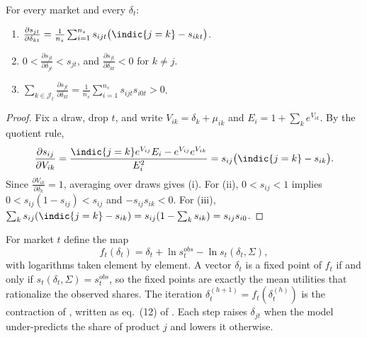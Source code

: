 \begin{lemma}\label{lem:C-sdelta}
For every market and every $\delta_t$:
\begin{enumerate}[label=(\roman*)]
  \item $\frac{\partial s_{jt}}{\partial\delta_{kt}} = \frac{1}{n_s}\sum_{i=1}^{n_s}s_{ijt}\big(\indic\{j = k\} -
  s_{ikt}\big)$.
  \item $0 < \frac{\partial s_{jt}}{\partial\delta_{jt}} < s_{jt}$, and $\frac{\partial s_{jt}}{\partial\delta_{kt}} <
  0$ for $k \ne j$.
  \item $\sum_{k \in \mathcal{J}_t}\frac{\partial s_{jt}}{\partial\delta_{kt}} = \frac{1}{n_s}\sum_{i=1}^{n_s}s_{ijt}
  s_{i0t} > 0$.
\end{enumerate}
\end{lemma}

\begin{proof}
Fix a draw, drop $t$, and write $V_{ik} = \delta_k + \mu_{ik}$ and $E_i = 1 + \sum_k e^{V_{ik}}$. By the quotient rule,
\[
  \frac{\partial s_{ij}}{\partial V_{ik}}
  = \frac{\indic\{j = k\}e^{V_{ij}}E_i - e^{V_{ij}}e^{V_{ik}}}{E_i^2}
  = s_{ij}\big(\indic\{j = k\} - s_{ik}\big) .
\]
Since $\frac{\partial V_{ik}}{\partial\delta_k} = 1$, averaging over draws gives (i). For (ii), $0 < s_{ij} < 1$
implies $0 < s_{ij}(1 - s_{ij}) < s_{ij}$ and $-s_{ij}s_{ik} < 0$. For (iii),
$\sum_k s_{ij}(\indic\{j = k\} - s_{ik}) = s_{ij}(1 - \sum_k s_{ik}) = s_{ij}s_{i0}$.
\end{proof}

For market $t$ define the map
\begin{equation}\label{eq:C-blp-map}
  f_t(\delta_t) = \delta_t + \ln s^{obs}_t - \ln s_t(\delta_t, \Sigma) ,
\end{equation}
with logarithms taken element by element. A vector $\delta_t$ is a fixed point of $f_t$ if and only if
$s_t(\delta_t, \Sigma) = s^{obs}_t$, so the fixed points are exactly the mean utilities that rationalize the observed
shares. The iteration $\delta^{(h+1)}_t = f_t(\delta^{(h)}_t)$ is the contraction of
\citet[eq.~6.8]{BerryLevinsohnPakes1995}, written as eq.~(12) of \citet[p.~533]{Nevo2000a}. Each step raises
$\delta_{jt}$ when the model under-predicts the share of product $j$ and lowers it otherwise.

